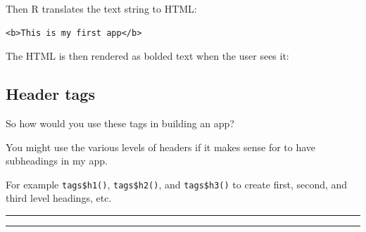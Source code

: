 \documentclass[
  letterpaper,
  DIV=11,
  numbers=noendperiod]{scrreprt}
\newenvironment{Shaded}{\begin{snugshade}}{\end{snugshade}}
\newcommand{\AttributeTok}[1]{\textcolor[rgb]{0.40,0.46,0.14}{#1}}
\newcommand{\CommentTok}[1]{\textcolor[rgb]{0.37,0.37,0.37}{#1}}
\newcommand{\ControlFlowTok}[1]{\textcolor[rgb]{0.00,0.46,0.62}{#1}}
\newcommand{\FunctionTok}[1]{\textcolor[rgb]{0.28,0.35,0.67}{#1}}
\newcommand{\NormalTok}[1]{\textcolor[rgb]{0.00,0.46,0.62}{#1}}
\newcommand{\OtherTok}[1]{\textcolor[rgb]{0.00,0.46,0.62}{#1}}
\newcommand{\SpecialCharTok}[1]{\textcolor[rgb]{0.37,0.37,0.37}{#1}}
\newcommand{\StringTok}[1]{\textcolor[rgb]{0.13,0.47,0.30}{#1}}
\begin{document}
Then R translates the text string to HTML:

\begin{verbatim}
<b>This is my first app</b>  
\end{verbatim}

The HTML is then rendered as bolded text when the user sees it:

\hypertarget{header-tags}{%
\subsection{Header tags}\label{header-tags}}

So how would you use these tags in building an app?

You might use the various levels of headers if it makes sense for to
have subheadings in my app.

For example \texttt{tags\$h1()}, \texttt{tags\$h2()}, and
\texttt{tags\$h3()} to create first, second, and third level headings,
etc.

\begin{Shaded}
\end{Shaded}

\begin{center}\rule{0.5\linewidth}{0.5pt}\end{center}

\begin{center}\rule{0.5\linewidth}{0.5pt}\end{center}
\end{document}

